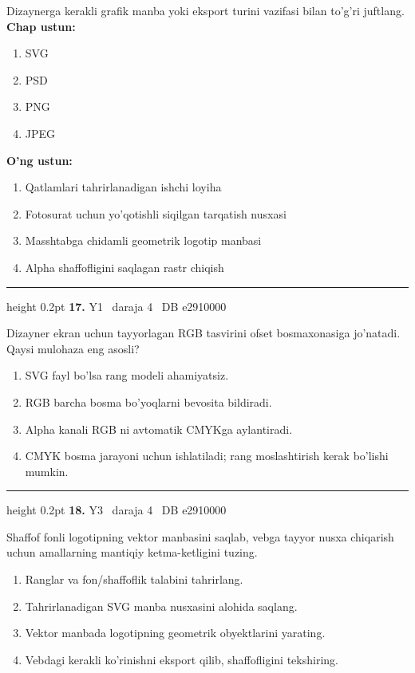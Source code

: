 \documentclass[10pt,a4paper,oneside]{article}
\begin{document}
\par
Dizaynerga kerakli grafik manba yoki eksport turini vazifasi bilan to'g'ri juftlang.
\textbf{\footnotesize Chap ustun:}
\begin{enumerate}[label=\arabic*),leftmargin=9mm]
\item SVG
\item PSD
\item PNG
\item JPEG
\end{enumerate}
\textbf{\footnotesize O'ng ustun:}
\begin{enumerate}[label=\Alph*),leftmargin=9mm]
\item Qatlamlari tahrirlanadigan ishchi loyiha
\item Fotosurat uchun yo'qotishli siqilgan tarqatish nusxasi
\item Masshtabga chidamli geometrik logotip manbasi
\item Alpha shaffofligini saqlagan rastr chiqish
\end{enumerate}
\vspace{2mm}\hrule height 0.2pt \vspace{4mm}
\hypertarget{q17}{\textbf{\color{ink}17.}}  {\color{muted}\scriptsize Y1 \textbullet\ daraja 4 \textbullet\ DB e2910000}
\par
Dizayner ekran uchun tayyorlagan RGB tasvirini ofset bosmaxonasiga jo'natadi. Qaysi mulohaza eng asosli?
\begin{enumerate}[label=\Alph*),leftmargin=9mm]
\item SVG fayl bo'lsa rang modeli ahamiyatsiz.
\item RGB barcha bosma bo'yoqlarni bevosita bildiradi.
\item Alpha kanali RGB ni avtomatik CMYKga aylantiradi.
\item CMYK bosma jarayoni uchun ishlatiladi; rang moslashtirish kerak bo'lishi mumkin.
\end{enumerate}
\vspace{2mm}\hrule height 0.2pt \vspace{4mm}
\hypertarget{q18}{\textbf{\color{ink}18.}}  {\color{muted}\scriptsize Y3 \textbullet\ daraja 4 \textbullet\ DB e2910000}
\par
Shaffof fonli logotipning vektor manbasini saqlab, vebga tayyor nusxa chiqarish uchun amallarning mantiqiy ketma-ketligini tuzing.
\begin{enumerate}[label=\Alph*),leftmargin=9mm]
\item Ranglar va fon/shaffoflik talabini tahrirlang.
\item Tahrirlanadigan SVG manba nusxasini alohida saqlang.
\item Vektor manbada logotipning geometrik obyektlarini yarating.
\item Vebdagi kerakli ko'rinishni eksport qilib, shaffofligini tekshiring.
\end{enumerate}
\end{document}
